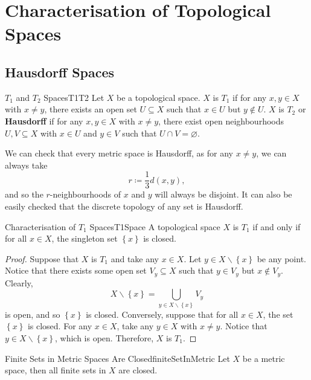 \documentclass[math]{amznotes}
\theoremstyle{remark}
\begin{document}
\chapter{Characterisation of Topological Spaces}
\section{Hausdorff Spaces}
\begin{dfnbox}{$T_1$ and $T_2$ Spaces}{T1T2}
    Let $X$ be a topological space. $X$ is {\color{red} \textbf{$T_1$}} if for any $x, y \in X$ with $x \neq y$, there exists an open set $U \subseteq X$ such that $x \in U$ but $y \notin U$. $X$ is {\color{red} \textbf{$T_2$}} or {\color{red} \textbf{Hausdorff}} if for any $x, y \in X$ with $x \neq y$, there exist open neighbourhoods $U, V \subseteq X$ with $x \in U$ and $y \in V$ such that $U \cap V = \varnothing$.
\end{dfnbox}
We can check that every metric space is Hausdorff, as for any $x \neq y$, we can always take 
\begin{equation*}
    r \coloneqq \frac{1}{3}d\left(x, y\right),
\end{equation*}
and so the $r$-neighbourhoods of $x$ and $y$ will always be disjoint. It can also be easily checked that the discrete topology of any set is Hausdorff.
\begin{probox}{Characterisation of $T_1$ Spaces}{T1Space}
    A topological space $X$ is $T_1$ if and only if for all $x \in X$, the singleton set $\left\{x\right\}$ is closed.
    \tcblower
    \begin{proof}
        Suppose that $X$ is $T_1$ and take any $x \in X$. Let $y \in X \backslash \left\{x\right\}$ be any point. Notice that there exists some open set $V_y \subseteq X$ such that $y \in V_y$ but $x \notin V_y$. Clearly, 
        \begin{equation*}
            X \backslash \left\{x\right\} = \bigcup_{y \in X \backslash \left\{x\right\}}V_y
        \end{equation*}
        is open, and so $\left\{x\right\}$ is closed. Conversely, suppose that for all $x \in X$, the set $\left\{x\right\}$ is closed. For any $x \in X$, take any $y \in X$ with $x \neq y$. Notice that $y \in X \backslash \left\{x\right\}$, which is open. Therefore, $X$ is $T_1$.
    \end{proof}
\end{probox}
\begin{corbox}{Finite Sets in Metric Spaces Are Closed}{finiteSetInMetric}
    Let $X$ be a metric space, then all finite sets in $X$ are closed.
\end{corbox}
\end{document}
